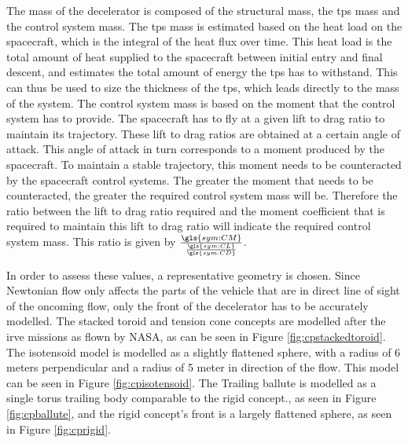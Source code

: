 The mass of the decelerator is composed of the structural mass, the \gls{tps} mass and the control system mass. 
The \gls{tps} mass is estimated based on the heat load on the spacecraft, which is the integral of the heat flux over time. This heat load is the total amount of heat supplied to the spacecraft between initial entry and final descent, and estimates the total amount of energy the \gls{tps} has to withstand. This can thus be used to size the thickness of the \gls{tps}, which leads directly to the mass of the system.
The control system mass is based on the moment that the control system has to provide. The spacecraft has to fly at a given lift to drag ratio to maintain its trajectory. These lift to drag ratios are obtained at a certain angle of attack. This angle of attack in turn corresponds to a moment produced by the spacecraft. To maintain a stable trajectory, this moment needs to be counteracted by the spacecraft control systems. The greater the moment that needs to be counteracted, the greater the required control system mass will be. Therefore the ratio between the lift to drag ratio required and the moment coefficient that is required to maintain this lift to drag ratio will indicate the required control system mass. This ratio is given by $\frac{\gls{sym:CM}}{\frac{\gls{sym:CL}}{\gls{sym:CD}}}$.

In order to assess these values, a representative geometry is chosen. Since Newtonian flow only affects the parts of the vehicle that are in direct line of sight of the oncoming flow, only the front of the decelerator has to be accurately modelled. The stacked toroid and tension cone concepts are modelled after the \gls{irve} missions as flown by NASA, as can be seen in Figure \ref{fig:cpstackedtoroid}. The isotensoid model is modelled as a slightly flattened sphere, with a radius of 6 meters perpendicular and a radius of 5 meter in direction of the flow. This model can be seen in Figure \ref{fig:cpisotensoid}. The Trailing ballute is modelled as a single torus trailing body comparable to the rigid concept., as seen in Figure \ref{fig:cpballute}, and the rigid concept's front is a largely flattened sphere, as seen in Figure \ref{fig:cprigid}.


